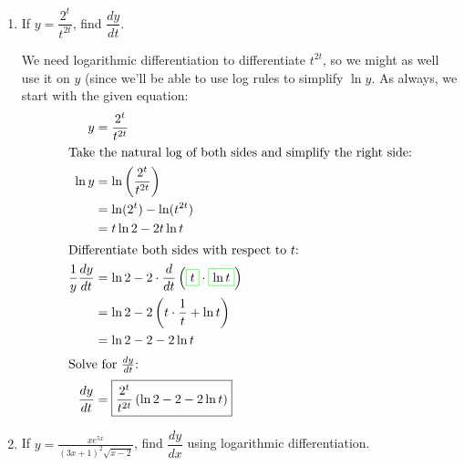 \documentclass{article}
\begin{document}
\begin{enumerate}[topsep=0pt]
\begin{enumerate}
  \item %
    \begin{problem}[\vfill\newpage]
      If $y = \dfrac{2^t}{t^{2t}}$, find
      $\dfrac{dy}{dt}$.
    \end{problem}

    \begin{solution}
      We need logarithmic differentiation to differentiate $t^{2t}$, so we
      might as well use it on $y$ (since we'll be able to use log rules to
      simplify $\ln y$.  As always, we start with the given equation:
      \begin{align*}
        y &= \frac{2^t}{t^{2t}} \\
        \intertext{Take the natural log of both sides and simplify the
          right side:}
        \ln y &= \ln \left( \frac{2^t}{t^{2t}} \right) \\
        &= \ln (2^t) - \ln (t^{2t}) \\
        &= t \ln 2 - 2t \ln t \\
        \intertext{Differentiate both sides with respect to $t$:}
        \frac{1}{y} \frac{dy}{dt} &=
        \ln 2-2\cdot \frac{d}{dt} \left(\fcolorbox{green}{white}{$\displaystyle  t$}\cdot \fcolorbox{green}{white}{$\displaystyle  \ln t$}\right) \\
        &= \ln 2 -2 \left(t\cdot \frac{1}{t}+ \ln t\right) \\
        &= \ln 2 - 2 - 2 \ln t \\
        \shortintertext{Solve for $\frac{dy}{dt}$:}
        \frac{dy}{dt} &= \boxed{\frac{2^t}{t^{2t}} \left( \ln 2 - 2 - 2
            \ln t \right)}
      \end{align*}    
    \end{solution}

  \item %
    \begin{problem}[\vfill]
      If $y = \displaystyle\frac{xe^{5x}}{(3x+1)^2 \sqrt{x-2}}$, find
      $\dfrac{dy}{dx}$ using logarithmic differentiation.
    \end{problem}


\end{enumerate}
\end{enumerate}
\end{document}
